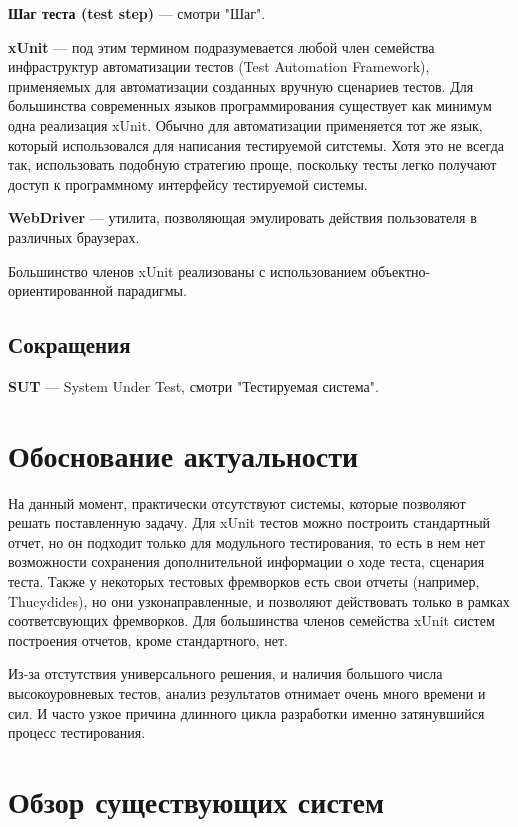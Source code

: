 {\bf Шаг теста (test step)} ---
смотри "Шаг".

{\bf xUnit} ---
под этим термином подразумевается любой член семейства инфраструктур автоматизации тестов (Test Automation Framework), применяемых для автоматизации созданных вручную сценариев тестов. Для большинства современных языков программирования существует как минимум одна реализация xUnit. Обычно для автоматизации применяется тот же язык, который использовался для написания тестируемой ситстемы. Хотя это не всегда так, использовать подобную стратегию проще, поскольку тесты легко получают доступ к программному интерфейсу тестируемой системы.

{\bf WebDriver} ---
утилита, позволяющая эмулировать действия пользователя в различных браузерах.

Большинство членов xUnit реализованы с использованием объектно-ориентированной парадигмы.

\subsection{Сокращения}

{\bf SUT} --- System Under Test, смотри "Тестируемая система".

\section{Обоснование актуальности}

На данный момент, практически отсутствуют системы, которые позволяют решать поставленную задачу. Для xUnit тестов можно построить стандартный отчет, но он подходит только для модульного тестирования, то есть в нем нет возможности сохранения дополнительной информации о ходе теста, сценария теста. Также у некоторых тестовых фремворков есть свои отчеты (например, Thucydides), но они узконаправленные, и позволяют действовать только в рамках соответсвующих фремворков. Для большинства членов семейства xUnit систем построения отчетов, кроме стандартного, нет.

Из-за отстутствия универсального решения, и наличия большого числа высокоуровневых тестов, анализ результатов отнимает очень много времени и сил. И часто узкое причина длинного цикла разработки именно затянувшийся процесс тестирования.

\section{Обзор существующих систем}


